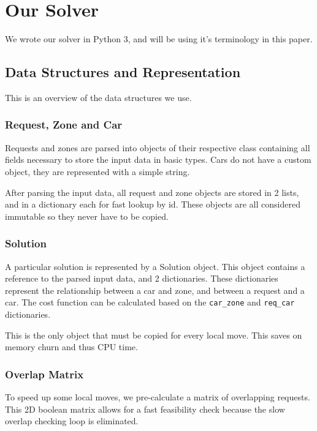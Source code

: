 \documentclass[11pt,a4paper]{article}
\begin{document}
\section{Our Solver}\label{sec:our-solver}

    We wrote our solver in Python 3, and will be using it's terminology in this paper.

    \subsection{Data Structures and Representation}\label{subsec:data-structures-and-representation}

        This is an overview of the data structures we use.

        \subsubsection{Request, Zone and Car}
            Requests and zones are parsed into objects of their respective class containing all fields necessary to store the input data in basic types.
            Cars do not have a custom object, they are represented with a simple string.

            After parsing the input data, all request and zone objects are stored in 2 lists, and in a dictionary each for fast lookup by id.
            These objects are all considered immutable so they never have to be copied.
        
        \subsubsection{Solution}
            A particular solution is represented by a Solution object.
            This object contains a reference to the parsed input data, and 2 dictionaries.
            These dictionaries represent the relationship between a car and zone, and between a request and a car.
            The cost function can be calculated based on the \texttt{car\_zone} and \texttt{req\_car} dictionaries.

            This is the only object that must be copied for every local move.
            This saves on memory churn and thus CPU time.

        \subsubsection{Overlap Matrix}
            To speed up some local moves, we pre-calculate a matrix of overlapping requests.
            This 2D boolean matrix allows for a fast feasibility check because the slow overlap checking loop is eliminated.
\end{document}
